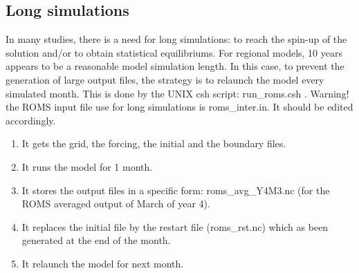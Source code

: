 \subsection{Long simulations}

In many studies, there is a need for long simulations: to reach the spin-up of 
the solution and/or to obtain statistical equilibriums.
For regional models, 10 years appears to be a reasonable model simulation length.
In this case, to prevent the generation of large output files, the strategy 
is to relaunch the model every simulated month.
This is done by the UNIX csh script: run\_roms.csh .
Warning! the ROMS input file use for long simulations is roms\_inter.in.
It should be edited accordingly.


\begin{enumerate}
\item It gets the grid, the forcing, the initial and the boundary files.
\item It runs the model for 1 month.
\item It stores the output files in a specific form: roms\_avg\_Y4M3.nc (for the ROMS 
averaged output of March of year 4).
\item It replaces the initial file by the restart file (roms\_rst.nc) which as 
been generated at the end of the month.
\item It relaunch the model for next month.
\end{enumerate}


